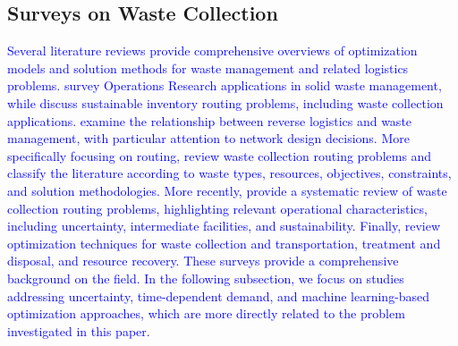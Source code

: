 \documentclass[authoryear,preprint,12pt]{elsarticle}
\newcommand{\rev}[1]{\textcolor{blue}{{#1}}}
\begin{document}
\subsection{Surveys on Waste Collection}

\rev{Several literature reviews provide comprehensive overviews of optimization models and solution methods for waste management and related logistics problems. \cite{Ghiani2014} survey Operations Research applications in solid waste management, while \cite{Malladi2018} discuss sustainable inventory routing problems, including waste collection applications. \cite{VanEngeland2020} examine the relationship between reverse logistics and waste management, with particular attention to network design decisions. More specifically focusing on routing, \cite{Belien2014} review waste collection routing problems and classify the literature according to waste types, resources, objectives, constraints, and solution methodologies. More recently, \cite{Hess2024} provide a systematic review of waste collection routing problems, highlighting relevant operational characteristics, including uncertainty, intermediate facilities, and sustainability. Finally, \cite{Alshaikh2024} review optimization techniques for waste collection and transportation, treatment and disposal, and resource recovery. These surveys provide a comprehensive background on the field. In the following subsection, we focus on studies addressing uncertainty, time-dependent demand, and machine learning-based optimization approaches, which are more directly related to the problem investigated in this paper.}




\end{document}
